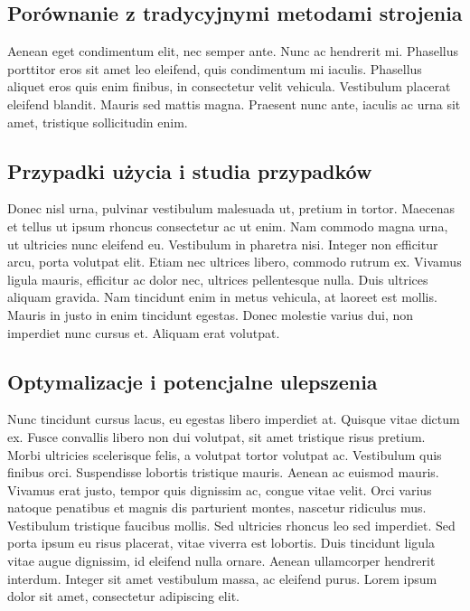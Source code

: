 \subsection{Porównanie z tradycyjnymi metodami strojenia}
\begin{spacing}{1.5} %
    Aenean eget condimentum elit, nec semper ante. Nunc ac hendrerit mi. Phasellus porttitor eros sit amet leo eleifend, quis condimentum mi iaculis. Phasellus aliquet eros quis enim finibus, in consectetur velit vehicula. Vestibulum placerat eleifend blandit. Mauris sed mattis magna. Praesent nunc ante, iaculis ac urna sit amet, tristique sollicitudin enim. 
\end{spacing} %

\subsection{Przypadki użycia i studia przypadków}
\begin{spacing}{1.5} %
    Donec nisl urna, pulvinar vestibulum malesuada ut, pretium in tortor. Maecenas et tellus ut ipsum rhoncus consectetur ac ut enim. Nam commodo magna urna, ut ultricies nunc eleifend eu. Vestibulum in pharetra nisi. Integer non efficitur arcu, porta volutpat elit. Etiam nec ultrices libero, commodo rutrum ex. Vivamus ligula mauris, efficitur ac dolor nec, ultrices pellentesque nulla. Duis ultrices aliquam gravida. Nam tincidunt enim in metus vehicula, at laoreet est mollis. Mauris in justo in enim tincidunt egestas. Donec molestie varius dui, non imperdiet nunc cursus et. Aliquam erat volutpat. 
\end{spacing} %

\subsection{Optymalizacje i potencjalne ulepszenia}
\begin{spacing}{1.5} %
    Nunc tincidunt cursus lacus, eu egestas libero imperdiet at. Quisque vitae dictum ex. Fusce convallis libero non dui volutpat, sit amet tristique risus pretium. Morbi ultricies scelerisque felis, a volutpat tortor volutpat ac. Vestibulum quis finibus orci. Suspendisse lobortis tristique mauris. Aenean ac euismod mauris. Vivamus erat justo, tempor quis dignissim ac, congue vitae velit. Orci varius natoque penatibus et magnis dis parturient montes, nascetur ridiculus mus. Vestibulum tristique faucibus mollis. Sed ultricies rhoncus leo sed imperdiet. Sed porta ipsum eu risus placerat, vitae viverra est lobortis. Duis tincidunt ligula vitae augue dignissim, id eleifend nulla ornare. Aenean ullamcorper hendrerit interdum. Integer sit amet vestibulum massa, ac eleifend purus. Lorem ipsum dolor sit amet, consectetur adipiscing elit. 
\end{spacing} %

